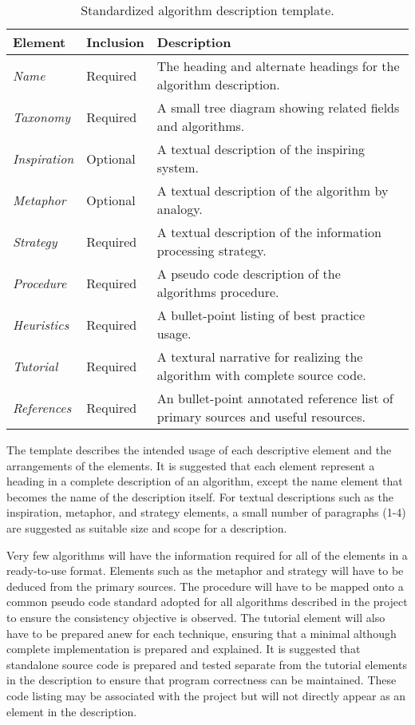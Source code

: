 \documentclass[a4paper, 11pt]{article}
\begin{document}
\begin{table}[ht]
	\centering
		\begin{tabularx}{\textwidth}{llX}
		\toprule
		\textbf{Element} & \textbf{Inclusion} &\textbf{Description} \\ 
		\toprule
		\emph{Name} & Required & The heading and alternate headings for the algorithm description.  \\ 
		\midrule
		\emph{Taxonomy} & Required & A small tree diagram showing related fields and algorithms. \\
		\midrule
		\emph{Inspiration} & Optional & A textual description of the inspiring system. \\
		\midrule
		\emph{Metaphor} & Optional & A textual description of the algorithm by analogy. \\
		\midrule
		\emph{Strategy} & Required & A textual description of the information processing strategy. \\
		\midrule
		\emph{Procedure} & Required & A pseudo code description of the algorithms procedure. \\
		\midrule
		\emph{Heuristics} & Required & A bullet-point listing of best practice usage. \\
		\midrule
		\emph{Tutorial} & Required & A textural narrative for realizing the algorithm with complete source code. \\
		\midrule
		\emph{References} & Required & An bullet-point annotated reference list of primary sources and useful resources. \\
		\bottomrule
		\end{tabularx}	
	\caption{Standardized algorithm description template.}
	\label{tab:template}
\end{table}

The template describes the intended usage of each descriptive element and the arrangements of the elements. It is suggested that each element represent a heading in a complete description of an algorithm, except the name element that becomes the name of the description itself. For textual descriptions such as the inspiration, metaphor, and strategy elements, a small number of paragraphs (1-4) are suggested as suitable size and scope for a description.

Very few algorithms will have the information required for all of the elements in a ready-to-use format. Elements such as the metaphor and strategy will have to be deduced from the primary sources. The procedure will have to be mapped onto a common pseudo code standard adopted for all algorithms described in the project to ensure the consistency objective is observed. The tutorial element will also have to be prepared anew for each technique, ensuring that a minimal although complete implementation is prepared and explained. 
It is suggested that standalone source code is prepared and tested separate from the tutorial elements in the description to ensure that program correctness can be maintained. These code listing may be associated with the project but will not directly appear as an element in the description.  
\end{document}
